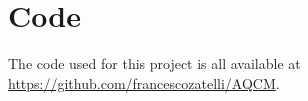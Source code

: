 \chapter{Code}
\label{sec:appendix-b}
The code used for this project is all available at \url{https://github.com/francescozatelli/AQCM}.